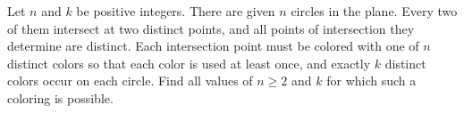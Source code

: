Let $n$ and $k$ be positive integers. There are given $n$ circles in the plane. Every two of them intersect at two distinct points, and all points of intersection they determine are distinct. Each intersection point must be colored with one of $n$ distinct colors so that each color is used at least once, and exactly $k$ distinct colors occur on each circle. Find all values of $n \geq 2$ and $k$ for which such a coloring is possible.
